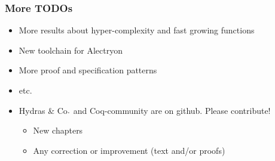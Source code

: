 \documentclass[10pt]{beamer}
\newcommand{\community}{Coq-community\xspace}
\newcommand{\alectr}{Alectryon\xspace}
\newcommand{\Hydras}{Hydras \& Co$\text.$\xspace}
\begin{document}

\begin{frame}
  \frametitle{More TODOs}
  \begin{block}{}
    \begin{itemize}
    \item More results about hyper-complexity and fast growing functions
    \item New toolchain for \alectr
    \item More proof and specification patterns
    \item etc.
    \item \Hydras and \community are on github. Please contribute!
      \begin{itemize}
      \item New chapters
      \item Any correction or improvement (text and/or proofs)
        
      \end{itemize}
    \end{itemize}
    
  \end{block}
  
\end{frame}
\end{document}
